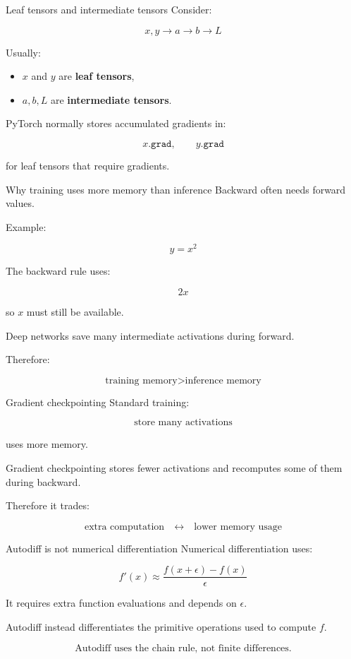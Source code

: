 \documentclass[10pt,aspectratio=169]{beamer}
\begin{document}
\begin{frame}[t]{Leaf tensors and intermediate tensors}
Consider:

\[
x,y
\rightarrow
a
\rightarrow
b
\rightarrow
L
\]

Usually:

\begin{itemize}
    \item \(x\) and \(y\) are \textbf{leaf tensors},
    \item \(a,b,L\) are \textbf{intermediate tensors}.
\end{itemize}

PyTorch normally stores accumulated gradients in:

\[
x.\texttt{grad},
\qquad
y.\texttt{grad}
\]

for leaf tensors that require gradients.
\end{frame}

\begin{frame}[t]{Why training uses more memory than inference}
Backward often needs forward values.

Example:

\[
y=x^2
\]

The backward rule uses:

\[
2x
\]

so \(x\) must still be available.

Deep networks save many intermediate activations during forward.

Therefore:

\[
\boxed{
\text{training memory}
>
\text{inference memory}
}
\]
\end{frame}

\begin{frame}[t]{Gradient checkpointing}
Standard training:

\[
\text{store many activations}
\]

uses more memory.

Gradient checkpointing stores fewer activations and recomputes some of them during backward.

Therefore it trades:

\[
\boxed{
\text{extra computation}
\quad\leftrightarrow\quad
\text{lower memory usage}
}
\]
\end{frame}

\begin{frame}[t]{Autodiff is not numerical differentiation}
Numerical differentiation uses:

\[
f'(x)
\approx
\frac{f(x+\epsilon)-f(x)}{\epsilon}
\]

It requires extra function evaluations and depends on \(\epsilon\).

Autodiff instead differentiates the primitive operations used to compute \(f\).

\[
\boxed{
\text{Autodiff uses the chain rule, not finite differences.}
}
\]
\end{frame}
\end{document}
